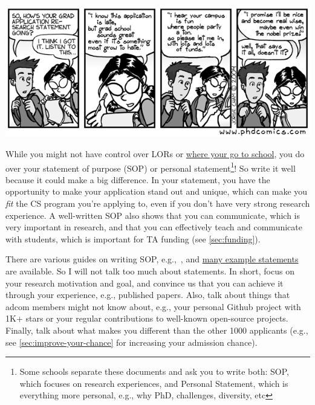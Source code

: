 \documentclass[oneside,11pt]{memoir}
\newenvironment{commentbox}[1][]{
  \small
  \begin{mybox}
    {\small \textbf{#1}}
  }{
  \end{mybox}
}
\begin{document}
\begin{center}
  \includegraphics[scale=0.4]{files/c2.png}
\end{center}

While you might not have control over LORs or \hyperref[sec:your-school]{where your go to school}, you do over your
statement of purpose (SOP) or personal statement\footnote{Some schools separate these documents and ask you to write both: SOP, which focuses on research experiences, and Personal Statement, which is everything more personal, e.g., why PhD, challenges, diversity, etc}! So write it well because it could make a big difference.
In your statement, you have the opportunity to make your application stand out and unique, which can make you \emph{fit} the CS program you're applying to, even if you don't have very strong research experience.
A well-written SOP also shows that you can communicate, which is very important in research, and that you can effectively teach and communicate with students, which is important for TA funding (see \autoref{sec:funding}).

There are various guides on writing SOP, e.g.,~\cite{blattman2022writing}, and \href{https://cs-sop.org/}{many example statements} are available. So I will not talk too much about statements. In short, focus on your research motivation and goal, and convince us that you can achieve it through your experience, e.g., published papers. Also, talk about things that adcom members might not know about, e.g., your personal Github project with 1K+ stars or your regular contributions to well-known open-source projects. Finally, talk about what makes you different than the other 1000 applicants (e.g., see \autoref{sec:improve-your-chance} for increasing your admission chance).



\end{document}
